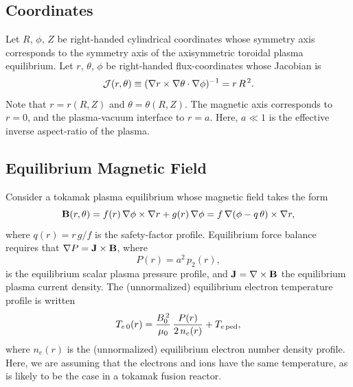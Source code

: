\documentclass[12pt,prb,aps]{revtex4-1}
\begin{document}
\subsection{Coordinates}\label{coord}
Let $R$, $\phi$, $Z$ be right-handed cylindrical coordinates whose symmetry axis corresponds to the symmetry axis of the axisymmetric toroidal plasma equilibrium.
Let $r$, $\theta$, $\phi$ be right-handed flux-coordinates whose
Jacobian is
\begin{equation}\label{jac}
{\cal J}(r,\theta)\equiv (\nabla r\times \nabla\theta\cdot\nabla\phi)^{-1}= r\,R^{\,2}.
\end{equation}
Note that $r=r(R,Z)$ and $\theta=\theta(R,Z)$. 
The magnetic axis corresponds to $r=0$, and the plasma-vacuum interface to $r=a$. Here, $a\ll 1$ is the effective inverse aspect-ratio of the plasma. 

\subsection{Equilibrium Magnetic Field}\label{equilb}
Consider a tokamak plasma equilibrium whose magnetic field takes the form
\begin{equation}
{\bf B}(r,\theta) = f(r)\,\nabla\phi\times \nabla r + g(r)\,\nabla\phi = f\,\nabla(\phi-q\,\theta)\times \nabla r,
\end{equation}
where
$q(r) = r\,g/f$ is the safety-factor profile.
Equilibrium force balance requires that
$ \nabla P={\bf J}\times {\bf B}$, 
where 
\begin{equation}
P(r)= a^2\,p_2(r),
\end{equation}
 is the equilibrium scalar plasma pressure profile, and ${\bf J}=\nabla\times {\bf B}$ the equilibrium plasma current density. 
 The (unnormalized) equilibrium electron temperature profile is written
 \begin{equation}
 T_{e\,0}(r) = \frac{B_0^{\,2}}{\mu_0}\,\frac{P(r)}{2\,n_e(r)} + T_{e\,{\rm ped}},
 \end{equation}
 where $n_e(r)$ is the (unnormalized) equilibrium electron number density profile. Here, we are assuming that the electrons and ions have the same
 temperature, as is likely to be the case in a tokamak fusion reactor. 
\end{document}
